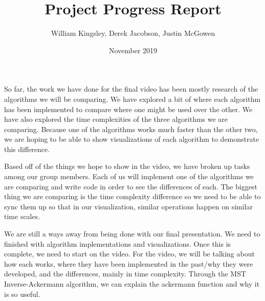 \documentclass[12pt]{article}
\title{Project Progress Report}
\author{William Kingsley, Derek Jacobson, Justin McGowen}
\date{November 2019}
\begin{document}
\maketitle


So far, the work we have done for the final video has been mostly research of the algorithms we will be comparing. We have explored a bit of where each algorithm has been implemented to compare where one might be used over the other. We have also explored the time complexities of the three algorithms we are comparing. Because one of the algorithms works much faster than the other two, we are hoping to be able to show visualizations of each algorithm to demonstrate this difference.

Based off of the things we hope to show in the video, we have broken up tasks among our group members. Each of us will implement one of the algorithms we are comparing and write code in order to see the differences of each. The biggest thing we are comparing is the time complexity difference so we need to be able to sync them up so that in our visualization, similar operations happen on similar time scales.

We are still a ways away from being done with our final presentation. We need to finished with algorithm implementations and visualizations. Once this is complete, we need to start on the video. For the video, we will be talking about how each works, where they have been implemented in the past/why they were developed, and the differences, mainly in time complexity. Through the MST Inverse-Ackermann algorithm, we can explain the ackermann function and why it is so useful.
\end{document}
